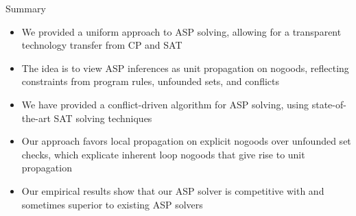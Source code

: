 \begin{frame}{Summary}
  \begin{itemize}
  \item We provided a \alert{uniform approach to ASP solving}, allowing for a
    transparent \alert{technology transfer from CP and SAT}
  \item The idea is to view ASP inferences as \alert{unit propagation on nogoods},
    reflecting \alert{constraints} from program rules, unfounded sets, and conflicts
  \item We have provided a \alert{conflict-driven algorithm for ASP} solving, using
    state-of-the-art SAT solving techniques
  \item Our approach \alert{favors local propagation} on explicit nogoods over unfounded
    set checks, which explicate inherent loop nogoods that give rise to unit
    propagation
  \item Our empirical results show that our ASP solver \alert{\clasp{} is competitive}
    with and sometimes superior to existing ASP solvers
  \end{itemize}
\end{frame}
%
